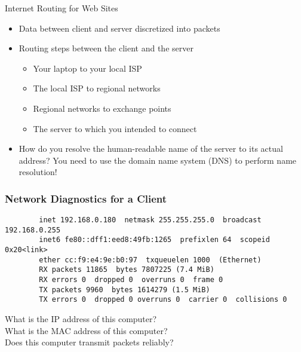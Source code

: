 \documentclass[14pt,aspectratio=169]{beamer}
\begin{document}
%
\begin{frame}{Internet Routing for Web Sites}
  \begin{itemize}
    \item Data between client and server discretized into packets
    \item Routing steps between the client and the server
      \begin{itemize}
        \item Your laptop to your local ISP
        \item The local ISP to regional networks
        \item Regional networks to exchange points
        \item The server to which you intended to connect
      \end{itemize}
      \vspace*{-.2in}
    \item How do you resolve the human-readable name of the server to its actual
      address? You need to use the domain name system (DNS) to perform name
      resolution!
  \end{itemize}
\end{frame}

%
\begin{frame}[fragile]
  \frametitle{Network Diagnostics for a Client}
  \normalsize
  \hspace*{-.65in}
  \begin{minipage}{6in}
    \vspace*{.25in}
    \begin{verbatim}
        inet 192.168.0.180  netmask 255.255.255.0  broadcast 192.168.0.255
        inet6 fe80::dff1:eed8:49fb:1265  prefixlen 64  scopeid 0x20<link>
        ether cc:f9:e4:9e:b0:97  txqueuelen 1000  (Ethernet)
        RX packets 11865  bytes 7807225 (7.4 MiB)
        RX errors 0  dropped 0  overruns 0  frame 0
        TX packets 9960  bytes 1614279 (1.5 MiB)
        TX errors 0  dropped 0 overruns 0  carrier 0  collisions 0
    \end{verbatim}
  \end{minipage}
  \vspace*{.25in}
  \begin{center}
    \normalsize \noindent What is the IP address of this computer? \\
    \normalsize \noindent What is the MAC address of this computer? \\
    \normalsize \noindent Does this computer transmit packets reliably? \\
  \end{center}
\end{frame}
\end{document}
